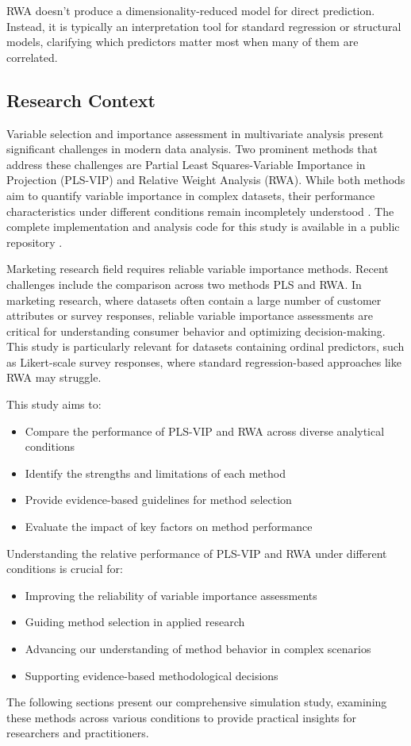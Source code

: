 RWA doesn't produce a dimensionality-reduced model for direct prediction. Instead, it is typically an interpretation tool for standard regression or structural models, clarifying which predictors matter most when many of them are correlated.

\subsection{Research Context}

Variable selection and importance assessment in multivariate analysis present significant challenges in modern data analysis. Two prominent methods that address these challenges are Partial Least Squares-Variable Importance in Projection (PLS-VIP) \citep{wold2001pls} and Relative Weight Analysis (RWA). While both methods aim to quantify variable importance in complex datasets, their performance characteristics under different conditions remain incompletely understood \citep{chong2005performance, tonidandel2011relative}. The complete implementation and analysis code for this study is available in a public repository \citep{marinucci2024pls}.

Marketing research field requires reliable variable importance methods. Recent challenges include the comparison across two methods PLS and RWA. In marketing research, where datasets often contain a large number of customer attributes or survey responses, reliable variable importance assessments are critical for understanding consumer behavior and optimizing decision-making. This study is particularly relevant for datasets containing ordinal predictors, such as Likert-scale survey responses, where standard regression-based approaches like RWA may struggle.

This study aims to:
\begin{itemize}
    \item Compare the performance of PLS-VIP and RWA across diverse analytical conditions
    \item Identify the strengths and limitations of each method
    \item Provide evidence-based guidelines for method selection
    \item Evaluate the impact of key factors on method performance
\end{itemize}

Understanding the relative performance of PLS-VIP and RWA under different conditions is crucial for:
\begin{itemize}
    \item Improving the reliability of variable importance assessments
    \item Guiding method selection in applied research
    \item Advancing our understanding of method behavior in complex scenarios
    \item Supporting evidence-based methodological decisions
\end{itemize}

The following sections present our comprehensive simulation study, examining these methods across various conditions to provide practical insights for researchers and practitioners. 